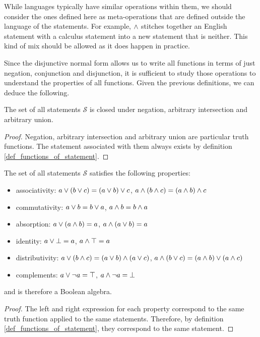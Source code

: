 \documentclass[11pt,letterpaper,fleqn]{memoir} %
\begin{document}
While languages typically have similar operations within them, we should consider the ones defined here as meta-operations that are defined outside the language of the statements. For example, $\wedge$ stitches together an English statement with a calculus statement into a new statement that is neither. This kind of mix should be allowed as it does happen in practice.

Since the disjunctive normal form allows us to write all functions in terms of just negation, conjunction and disjunction, it is sufficient to study those operations to understand the properties of all functions. Given the previous definitions, we can deduce the following.

\begin{mathSection}
	\begin{prop}
		The set of all statements $\mathcal{S}$ is closed under negation, arbitrary intersection and arbitrary union.
	\end{prop}
	\begin{proof}
		Negation, arbitrary intersection and arbitrary union are particular truth functions. The statement associated with them always exists by definition  \eqref{def_functions_of_statement}.
	\end{proof}
	\begin{prop}\label{boolean_properties}
		The set of all statements $\mathcal{S}$ satisfies the following properties:
		\begin{itemize}
			\item associativity: $a \vee (b \vee c) = (a \vee b) \vee c$, $a \wedge (b \wedge c) = (a \wedge b) \wedge c$
			\item commutativity: $a \vee b = b \vee a$, $a \wedge b = b \wedge a$
			\item absorption: $a \vee (a \wedge b) = a$, $a \wedge (a \vee b) = a$
			\item identity: $a \vee \bot = a
			$, $a \wedge \top = a$
			\item distributivity: $a \vee (b \wedge c) = (a \vee b) \wedge (a \vee c)$, $a \wedge (b \vee c) = (a \wedge b) \vee (a \wedge c)$
			\item complements: $a \vee \neg a = \top$, $a \wedge \neg a = \bot$
		\end{itemize}
		and is therefore a Boolean algebra.
	\end{prop}
	\begin{proof}
		The left and right expression for each property correspond to the same truth function applied to the same statements. Therefore, by definition  \eqref{def_functions_of_statement}, they correspond to the same statement.
	\end{proof}
\end{mathSection}
\end{document}
